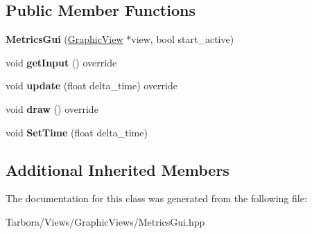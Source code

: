 \subsection*{Public Member Functions}
\begin{DoxyCompactItemize}
\item 
\mbox{\label{classTarbora_1_1MetricsGui_ac765e76dddb13b5caa1fb0037467ee45}} 
{\bfseries Metrics\+Gui} (\hyperlink{classTarbora_1_1GraphicView}{Graphic\+View} $\ast$view, bool start\+\_\+active)
\item 
\mbox{\label{classTarbora_1_1MetricsGui_a6efa7ebc05866401aa96235e4d96feb6}} 
void {\bfseries get\+Input} () override
\item 
\mbox{\label{classTarbora_1_1MetricsGui_a16532223c4313a559e58b51a5af4cb62}} 
void {\bfseries update} (float delta\+\_\+time) override
\item 
\mbox{\label{classTarbora_1_1MetricsGui_a2dc79e283aa20a6d0838f6edbb5fa701}} 
void {\bfseries draw} () override
\item 
\mbox{\label{classTarbora_1_1MetricsGui_ae5d19518e7841b39e44f7b88c95f9d93}} 
void {\bfseries Set\+Time} (float delta\+\_\+time)
\end{DoxyCompactItemize}
\subsection*{Additional Inherited Members}


The documentation for this class was generated from the following file\+:\begin{DoxyCompactItemize}
\item 
Tarbora/\+Views/\+Graphic\+Views/Metrics\+Gui.\+hpp\end{DoxyCompactItemize}

